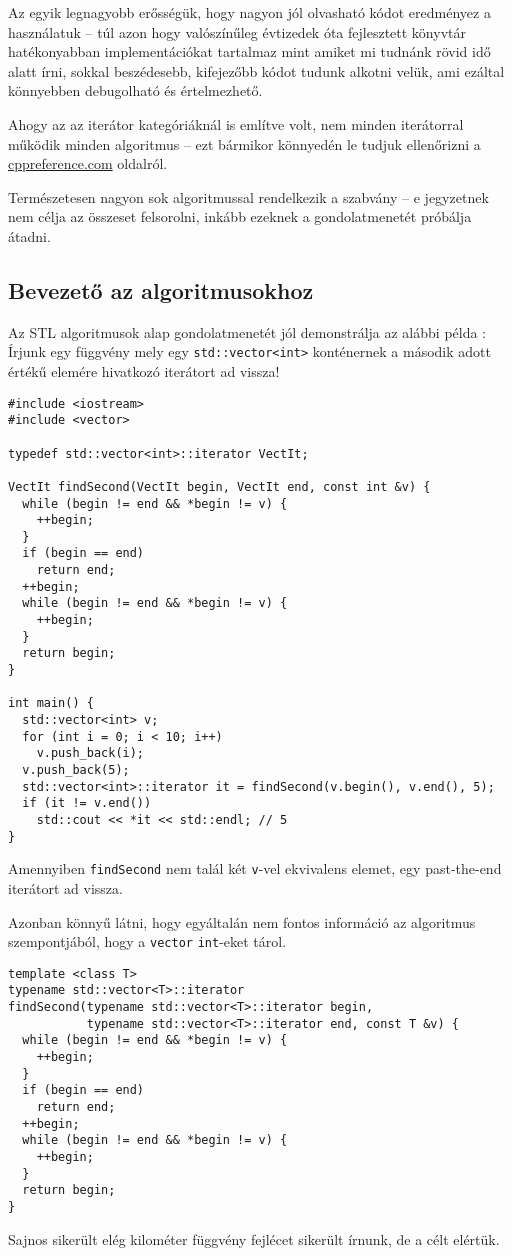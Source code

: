 \documentclass[../cpp_book/cpp_book.tex]{subfiles}
\begin{document}
	Az egyik legnagyobb erősségük, hogy nagyon jól olvasható kódot eredményez a használatuk -- túl azon hogy valószínűleg évtizedek óta fejlesztett könyvtár hatékonyabban implementációkat tartalmaz mint amiket mi tudnánk rövid idő alatt írni, sokkal beszédesebb, kifejezőbb kódot tudunk alkotni velük, ami ezáltal könnyebben debugolható és értelmezhető.
	
	Ahogy az az iterátor kategóriáknál is említve volt, nem minden iterátorral működik minden algoritmus -- ezt bármikor könnyedén le tudjuk ellenőrizni a \url{cppreference.com} oldalról.
	\begin{note}
		Természetesen nagyon sok algoritmussal rendelkezik a szabvány -- e jegyzetnek nem célja az összeset felsorolni, inkább ezeknek a gondolatmenetét próbálja átadni.
	\end{note}
	\subsection{Bevezető az algoritmusokhoz}
	
	Az STL algoritmusok alap gondolatmenetét jól demonstrálja az alábbi példa : Írjunk egy függvény mely egy \texttt{std::vector<int>} konténernek a második adott értékű elemére hivatkozó iterátort ad vissza!
	\begin{lstlisting}
#include <iostream>
#include <vector>

typedef std::vector<int>::iterator VectIt;

VectIt findSecond(VectIt begin, VectIt end, const int &v) {
  while (begin != end && *begin != v) {
    ++begin;
  }
  if (begin == end)
    return end;
  ++begin;
  while (begin != end && *begin != v) {
    ++begin;
  }
  return begin;
}

int main() {
  std::vector<int> v;
  for (int i = 0; i < 10; i++)
    v.push_back(i);
  v.push_back(5);
  std::vector<int>::iterator it = findSecond(v.begin(), v.end(), 5);
  if (it != v.end())
    std::cout << *it << std::endl; // 5
}
	\end{lstlisting}
	Amennyiben \texttt{findSecond} nem talál két \texttt{v}-vel ekvivalens elemet, egy past-the-end iterátort ad vissza.
	
	\smallskip
	Azonban könnyű látni, hogy egyáltalán nem fontos információ az algoritmus szempontjából, hogy a \texttt{vector} \texttt{int}-eket tárol.
	\begin{lstlisting}
template <class T>
typename std::vector<T>::iterator
findSecond(typename std::vector<T>::iterator begin,
           typename std::vector<T>::iterator end, const T &v) {
  while (begin != end && *begin != v) {
    ++begin;
  }
  if (begin == end)
    return end;
  ++begin;
  while (begin != end && *begin != v) {
    ++begin;
  }
  return begin;
}
	\end{lstlisting}
	Sajnos sikerült elég kilométer függvény fejlécet sikerült írnunk, de a célt elértük.
	
\end{document}
